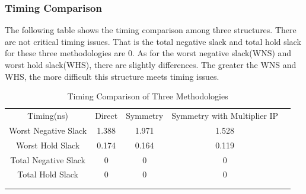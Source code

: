 \documentclass[a4paper]{article}
\begin{document}
\subsubsection{Timing Comparison}
The following table shows the timing comparison among three structures. There are not critical timing issues. That is the total negative slack and total hold slack for these three methodologies are 0. As for the worst negative slack(WNS) and worst hold slack(WHS), there are slightly differences. The greater the WNS and WHS, the more difficult this structure meets timing issues.
\begin{table}[]
\centering
\begin{tabular}{ccccl}
\cline{1-4}
\multicolumn{1}{|c|}{Timing(ns)}           & \multicolumn{1}{c|}{Direct} & \multicolumn{1}{c|}{Symmetry} & \multicolumn{1}{c|}{Symmetry with Multiplier IP} &  \\ \cline{1-4}
\multicolumn{1}{|c|}{Worst Negative Slack} & \multicolumn{1}{c|}{1.388}  & \multicolumn{1}{c|}{1.971}    & \multicolumn{1}{c|}{1.528}                       &  \\ \cline{1-4}
\multicolumn{1}{|c|}{Worst Hold Slack}     & \multicolumn{1}{c|}{0.174}  & \multicolumn{1}{c|}{0.164}    & \multicolumn{1}{c|}{0.119}                       &  \\ \cline{1-4}
\multicolumn{1}{|c|}{Total Negative Slack} & \multicolumn{1}{c|}{0} & \multicolumn{1}{c|}{0} & \multicolumn{1}{c|}{0} &  \\ \cline{1-4}
\multicolumn{1}{|c|}{Total Hold Slack}     & \multicolumn{1}{c|}{0} & \multicolumn{1}{c|}{0} & \multicolumn{1}{c|}{0} &  \\ \cline{1-4}
                                           &                        &                        &                        &  \\
                                           &                        &                        &                        & 
\end{tabular}
\caption{Timing Comparison of Three Methodologies}
\end{table}
\end{document}
